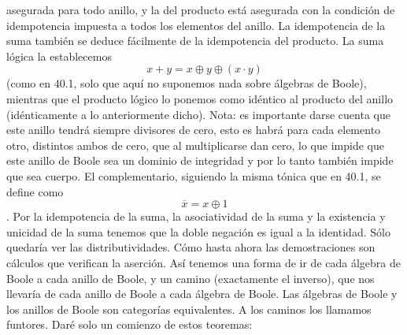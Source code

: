 \begin{enumerate}
\begin{enumerate}
\begin{enumerate}
      asegurada para todo anillo, y la del producto está asegurada con
      la con\-dición de idempotencia impuesta a todos los elementos del
      anillo. La idempotencia de la suma también se deduce fácilmente de
      la idempotencia del producto. La suma lógica la establecemos
      \[{{x + y} = x} \oplus y \oplus {({x \cdot y})}\](como en 40.1,
      solo que aquí no su\-ponemos nada sobre álgebras de Boole),
      mientras que el producto lógico lo pone\-mos como idéntico al
      producto del anillo (idénticamente a lo anteriormente dicho).
      Nota: es importante darse cuenta que este anillo tendrá siempre
      divisores de cero, esto es habrá para cada elemento otro,
      distintos ambos de cero, que al multiplicarse dan cero, lo que
      impide que este anillo de Boole sea un dominio de integridad y por
      lo tanto también impide que sea cuerpo. El complementario,
      siguiendo la misma tó\-nica que en 40.1, se define como
      \[{\overline{x} = x} \oplus 1\]. Por la idempotencia de la suma,
      la asociatividad de la suma y la existencia y unicidad de la suma
      tenemos que la doble negación es igual a la identidad. Sólo
      quedaría ver las distributividades. Cómo hasta ahora las
      demostraciones son cálculos que verifican la aserción. Así tenemos
      una forma de ir de cada álgebra de Boole a cada anillo de Boole, y
      un camino (exacta\-mente el inverso), que nos llevaría de cada
      anillo de Boole a cada álgebra de Boole. Las álgebras de Boole y
      los anillos de Boole son categorías equivalentes. A los ca\-minos
      los llamamos funtores. Daré solo un comienzo de estos teoremas:


\end{enumerate}
\end{enumerate}
\end{enumerate}
